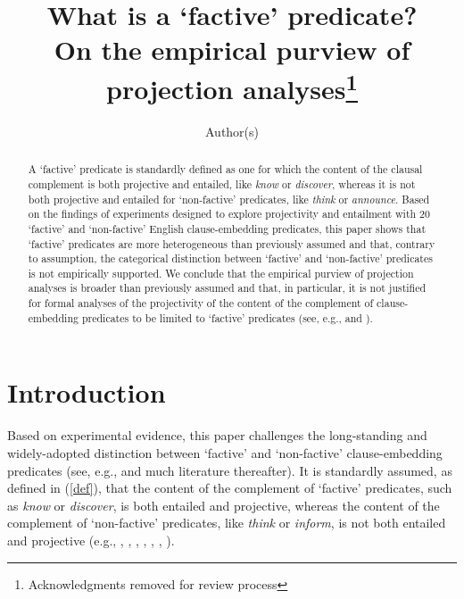 \documentclass[11pt,fleqn]{article}
\title{What is a `factive' predicate? \\ On the empirical purview of projection analyses\thanks{Acknowledgments removed for review process}}
\author{Author(s)}
\newcommand{\6}{\mbox{$[\hspace*{-.6mm}[$}}
\newcommand{\9}{\mbox{$]\hspace*{-.6mm}]$}}
\begin{document}

\maketitle


\begin{abstract}

A `factive' predicate is standardly defined as one for which the content of the clausal complement is both projective and entailed, like {\em know} or {\em discover}, whereas it is not both projective and entailed for `non-factive' predicates, like {\em think} or {\em announce}. Based on the findings of experiments designed to explore projectivity and entailment with 20 `factive' and `non-factive' English clause-embedding predicates, this paper shows that `factive' predicates are more heterogeneous than previously assumed and that, contrary to assumption, the categorical distinction between `factive' and `non-factive' predicates is not empirically supported. We conclude that the empirical purview of projection analyses is broader than previously assumed and that, in particular, it is not justified for formal analyses of the projectivity of the content of the complement of clause-embedding predicates to be limited to `factive' predicates (see, e.g., \citealt{heim83,vds92,abrusan2011,abrusan2016,romoli2015} and \citealt{best-question}).


\end{abstract}
			
\section{Introduction}\label{s1}

Based on experimental evidence, this paper challenges the long-standing and widely-adopted distinction between `factive' and `non-factive' clause-embedding predicates (see, e.g.,\citealt{karttunen71b,kiparsky-kiparsky71} and much literature thereafter). It is standardly assumed, as defined in (\ref{def}), that the content of the complement of `factive' predicates, such as {\em know} or {\em discover}, is both entailed and projective, whereas the content of the complement of `non-factive' predicates, like {\em think} or {\em inform},  is not both entailed and projective (e.g., \citealt[119-123]{gazdar79a}, \citealt[355]{ccmg90}, \citealt[345]{vds92},  \citealt[3]{abbott06}, \citealt[139]{schlenker10}, \citealt[77]{anand-hacquard2014}, \citealt[fn.7]{spector-egre2015}).
\end{document}
